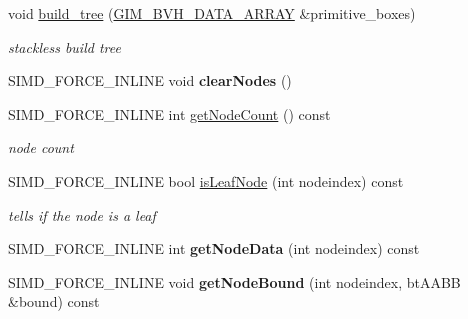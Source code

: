 \begin{DoxyCompactItemize}
\item 
void \hyperlink{classbt_bvh_tree_aed589b2985838c6268597f4f64a96c46}{build\+\_\+tree} (\hyperlink{class_g_i_m___b_v_h___d_a_t_a___a_r_r_a_y}{G\+I\+M\+\_\+\+B\+V\+H\+\_\+\+D\+A\+T\+A\+\_\+\+A\+R\+R\+A\+Y} \&primitive\+\_\+boxes)
\begin{DoxyCompactList}\small\item\em stackless build tree \end{DoxyCompactList}\item 
\hypertarget{classbt_bvh_tree_ad9963d9620aad83024c3d01d7c08a341}{S\+I\+M\+D\+\_\+\+F\+O\+R\+C\+E\+\_\+\+I\+N\+L\+I\+N\+E void {\bfseries clear\+Nodes} ()}\label{classbt_bvh_tree_ad9963d9620aad83024c3d01d7c08a341}

\item 
\hypertarget{classbt_bvh_tree_a676b9b3a4c8ba0a2c215b20d9448d985}{S\+I\+M\+D\+\_\+\+F\+O\+R\+C\+E\+\_\+\+I\+N\+L\+I\+N\+E int \hyperlink{classbt_bvh_tree_a676b9b3a4c8ba0a2c215b20d9448d985}{get\+Node\+Count} () const }\label{classbt_bvh_tree_a676b9b3a4c8ba0a2c215b20d9448d985}

\begin{DoxyCompactList}\small\item\em node count \end{DoxyCompactList}\item 
\hypertarget{classbt_bvh_tree_af5d8776467b0f7c9e12091f813f6b2af}{S\+I\+M\+D\+\_\+\+F\+O\+R\+C\+E\+\_\+\+I\+N\+L\+I\+N\+E bool \hyperlink{classbt_bvh_tree_af5d8776467b0f7c9e12091f813f6b2af}{is\+Leaf\+Node} (int nodeindex) const }\label{classbt_bvh_tree_af5d8776467b0f7c9e12091f813f6b2af}

\begin{DoxyCompactList}\small\item\em tells if the node is a leaf \end{DoxyCompactList}\item 
\hypertarget{classbt_bvh_tree_a4c74de8866d95d2c463202d79cf30bb1}{S\+I\+M\+D\+\_\+\+F\+O\+R\+C\+E\+\_\+\+I\+N\+L\+I\+N\+E int {\bfseries get\+Node\+Data} (int nodeindex) const }\label{classbt_bvh_tree_a4c74de8866d95d2c463202d79cf30bb1}

\item 
\hypertarget{classbt_bvh_tree_aa5ba5267a383b6225bba18b788ad3281}{S\+I\+M\+D\+\_\+\+F\+O\+R\+C\+E\+\_\+\+I\+N\+L\+I\+N\+E void {\bfseries get\+Node\+Bound} (int nodeindex, bt\+A\+A\+B\+B \&bound) const }\label{classbt_bvh_tree_aa5ba5267a383b6225bba18b788ad3281}


\end{DoxyCompactItemize}
